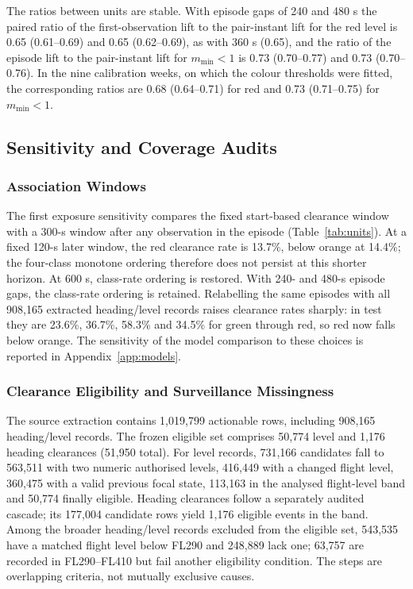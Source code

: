 \documentclass[aerospace,article,submit,moreauthors]{Definitions/mdpi}
\newcommand{\mmin}{m_{\min}}
\begin{document}
The ratios between units are stable. With episode gaps of 240 and 480 s the paired ratio of the first-observation lift to the pair-instant lift for the red level is 0.65 (0.61--0.69) and 0.65 (0.62--0.69), as with 360 s (0.65), and the ratio of the episode lift to the pair-instant lift for $\mmin<1$ is 0.73 (0.70--0.77) and 0.73 (0.70--0.76). In the nine calibration weeks, on which the colour thresholds were fitted, the corresponding ratios are 0.68 (0.64--0.71) for red and 0.73 (0.71--0.75) for $\mmin<1$.

\subsection{Sensitivity and Coverage Audits}\label{sec:results_sensitivity}
\subsubsection{Association Windows}
The first exposure sensitivity compares the fixed start-based clearance window with a 300-s window after any observation in the episode (Table~\ref{tab:units}). At a fixed 120-s later window, the red clearance rate is 13.7\%, below orange at 14.4\%; the four-class monotone ordering therefore does not persist at this shorter horizon. At 600 s, class-rate ordering is restored. With 240- and 480-s episode gaps, the class-rate ordering is retained. Relabelling the same episodes with all 908,165 extracted heading/level records raises clearance rates sharply: in test they are 23.6\%, 36.7\%, 58.3\% and 34.5\% for green through red, so red now falls below orange. The sensitivity of the model comparison to these choices is reported in Appendix~\ref{app:models}.

\subsubsection{Clearance Eligibility and Surveillance Missingness}
The source extraction contains 1,019,799 actionable rows, including 908,165 heading/level records. The frozen eligible set comprises 50,774 level and 1,176 heading clearances (51,950 total). For level records, 731,166 candidates fall to 563,511 with two numeric authorised levels, 416,449 with a changed flight level, 360,475 with a valid previous focal state, 113,163 in the analysed flight-level band and 50,774 finally eligible. Heading clearances follow a separately audited cascade; its 177,004 candidate rows yield 1,176 eligible events in the band. Among the broader heading/level records excluded from the eligible set, 543,535 have a matched flight level below FL290 and 248,889 lack one; 63,757 are recorded in FL290--FL410 but fail another eligibility condition. The steps are overlapping criteria, not mutually exclusive causes.
\end{document}
